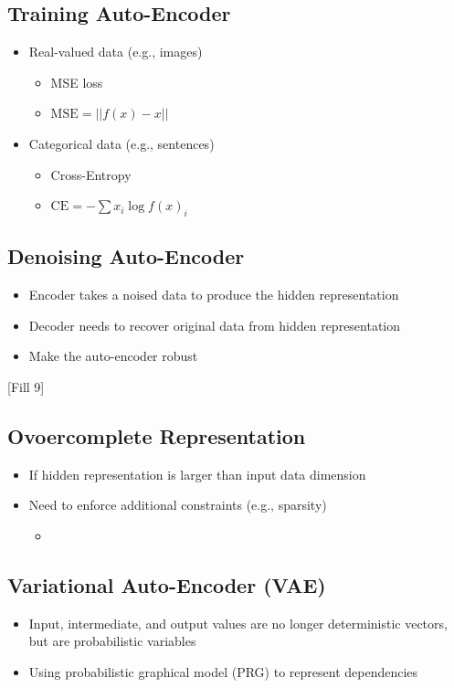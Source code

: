 \documentclass[10pt]{article}
\begin{document}
\subsection*{Training Auto-Encoder}
\begin{itemize}
	\item Real-valued data (e.g., images)
	\begin{itemize}
	    \item MSE loss
	    \item $\text{MSE} = ||f(x) - x||$
    \end{itemize}
    \item Categorical data (e.g., sentences)
    \begin{itemize}
	    \item Cross-Entropy
	    \item $\text{CE} = -\sum x_i \log f(x)_i$
    \end{itemize}
\end{itemize}

\subsection*{Denoising Auto-Encoder}
\begin{itemize}
	\item Encoder takes a noised data to produce the hidden representation
	\item Decoder needs to recover original data from hidden representation
	\item Make the auto-encoder robust
\end{itemize}
[Fill 9]

\subsection*{Ovoercomplete Representation}
\begin{itemize}
	\item If hidden representation is larger than input data dimension
	\item Need to enforce additional constraints (e.g., sparsity)
	\begin{itemize}
	    \item [FILL loss]  
    \end{itemize}
\end{itemize}

\subsection*{Variational Auto-Encoder (VAE)}
\begin{itemize}
	\item Input, intermediate, and output values are no longer deterministic vectors, but are probabilistic variables
	\item Using probabilistic graphical model (PRG) to represent dependencies
\end{itemize}
\end{document}
